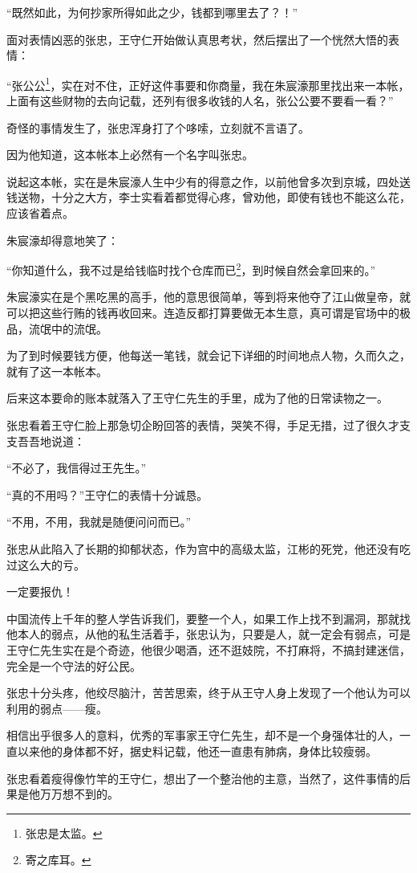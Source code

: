 \begin{multicols}{\theparacolNo}
		“既然如此，为何抄家所得如此之少，钱都到哪里去了？！”

		面对表情凶恶的张忠，王守仁开始做认真思考状，然后摆出了一个恍然大悟的表情：

		“张公公\footnote{张忠是太监。}，实在对不住，正好这件事要和你商量，我在朱宸濠那里找出来一本帐，上面有这些财物的去向记载，还列有很多收钱的人名，张公公要不要看一看？”

		奇怪的事情发生了，张忠浑身打了个哆嗦，立刻就不言语了。

		因为他知道，这本帐本上必然有一个名字叫张忠。

		说起这本帐，实在是朱宸濠人生中少有的得意之作，以前他曾多次到京城，四处送钱送物，十分之大方，李士实看着都觉得心疼，曾劝他，即使有钱也不能这么花，应该省着点。

		朱宸濠却得意地笑了：

		“你知道什么，我不过是给钱临时找个仓库而已\footnote{寄之库耳。}，到时候自然会拿回来的。”

		朱宸濠实在是个黑吃黑的高手，他的意思很简单，等到将来他夺了江山做皇帝，就可以把这些行贿的钱再收回来。连造反都打算要做无本生意，真可谓是官场中的极品，流氓中的流氓。

		为了到时候要钱方便，他每送一笔钱，就会记下详细的时间地点人物，久而久之，就有了这一本帐本。

		后来这本要命的账本就落入了王守仁先生的手里，成为了他的日常读物之一。

		张忠看着王守仁脸上那急切企盼回答的表情，哭笑不得，手足无措，过了很久才支支吾吾地说道：

		“不必了，我信得过王先生。”

		“真的不用吗？”王守仁的表情十分诚恳。

		“不用，不用，我就是随便问问而已。”

		张忠从此陷入了长期的抑郁状态，作为宫中的高级太监，江彬的死党，他还没有吃过这么大的亏。

		一定要报仇！

		中国流传上千年的整人学告诉我们，要整一个人，如果工作上找不到漏洞，那就找他本人的弱点，从他的私生活着手，张忠认为，只要是人，就一定会有弱点，可是王守仁先生实在是个奇迹，他很少喝酒，还不逛妓院，不打麻将，不搞封建迷信，完全是一个守法的好公民。

		张忠十分头疼，他绞尽脑汁，苦苦思索，终于从王守人身上发现了一个他认为可以利用的弱点——瘦。

		相信出乎很多人的意料，优秀的军事家王守仁先生，却不是一个身强体壮的人，一直以来他的身体都不好，据史料记载，他还一直患有肺病，身体比较瘦弱。

		张忠看着瘦得像竹竿的王守仁，想出了一个整治他的主意，当然了，这件事情的后果是他万万想不到的。


\end{multicols}

